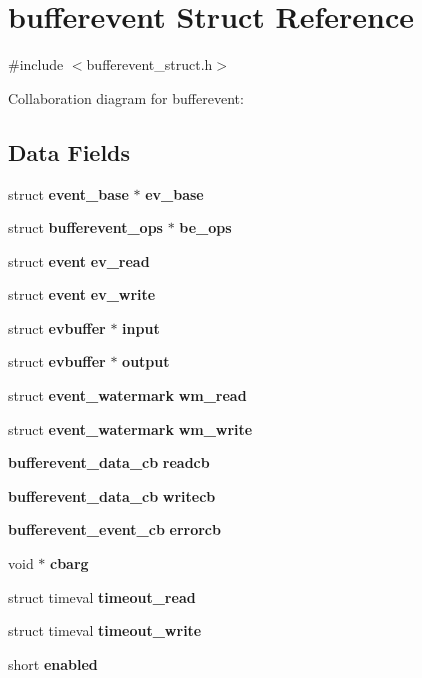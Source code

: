 \section{bufferevent \-Struct \-Reference}
\label{structbufferevent}


{\ttfamily \#include $<$bufferevent\-\_\-struct.\-h$>$}



\-Collaboration diagram for bufferevent\-:
\subsection*{\-Data \-Fields}
\begin{DoxyCompactItemize}
\item 
struct {\bf event\-\_\-base} $\ast$ {\bf ev\-\_\-base}
\item 
struct {\bf bufferevent\-\_\-ops} $\ast$ {\bf be\-\_\-ops}
\item 
struct {\bf event} {\bf ev\-\_\-read}
\item 
struct {\bf event} {\bf ev\-\_\-write}
\item 
struct {\bf evbuffer} $\ast$ {\bf input}
\item 
struct {\bf evbuffer} $\ast$ {\bf output}
\item 
struct {\bf event\-\_\-watermark} {\bfseries wm\-\_\-read}\label{structbufferevent_a929afd0dfd722ade75580fed4576d78d}

\item 
struct {\bf event\-\_\-watermark} {\bfseries wm\-\_\-write}\label{structbufferevent_a115bc662d05e88b56fac3313603cc852}

\item 
{\bf bufferevent\-\_\-data\-\_\-cb} {\bfseries readcb}\label{structbufferevent_af14e28ae450704cb7ecef85cec948a0e}

\item 
{\bf bufferevent\-\_\-data\-\_\-cb} {\bfseries writecb}\label{structbufferevent_a6178900b2733af6993824bbbdae5fddc}

\item 
{\bf bufferevent\-\_\-event\-\_\-cb} {\bfseries errorcb}\label{structbufferevent_ac5cc9a0d3231c174e171a8eec5170e53}

\item 
void $\ast$ {\bfseries cbarg}\label{structbufferevent_aafd3d1a6343925cb274875556a6faa0e}

\item 
struct timeval {\bfseries timeout\-\_\-read}\label{structbufferevent_a4d8958e3e5e7c17b59f2cfd85e5307c1}

\item 
struct timeval {\bfseries timeout\-\_\-write}\label{structbufferevent_a45111ccd3ef795ee17cc5f238830de0e}

\item 
short {\bf enabled}
\end{DoxyCompactItemize}


